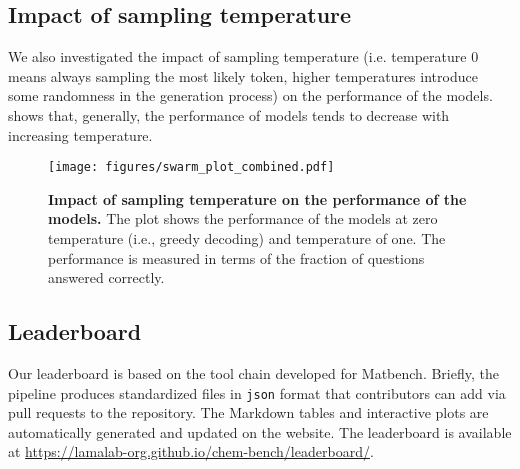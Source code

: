 \clearpage
\subsection{Impact of sampling temperature}
We also investigated the impact of sampling temperature (i.e. temperature 0 means always sampling the most likely token, higher temperatures introduce some randomness in the generation process) on the performance of the models.  shows that, generally, the performance of models tends to decrease with increasing temperature.

\begin{figure}[!h]
    \centering
    \texttt{[image: figures/swarm\_plot\_combined.pdf]}
    \caption{\textbf{Impact of sampling temperature on the performance of the models.} The plot shows the performance of the models at zero temperature (i.e., greedy decoding) and temperature of one. The performance is measured in terms of the fraction of questions answered correctly.}
    \label{fig:temperature_impact}
\end{figure}





\clearpage
\subsection{Leaderboard}
Our leaderboard is based on the tool chain developed for Matbench.\autocite{Dunn_2020}
Briefly, the \chembench pipeline produces standardized files in \texttt{json} format that contributors can add via pull requests to the \chembench repository.
The Markdown tables and interactive plots are automatically generated and updated on the \chembench website. The leaderboard is available at \url{https://lamalab-org.github.io/chem-bench/leaderboard/}.

\clearpage

\printnoidxglossary[type=\acronymtype, nonumberlist]  %
